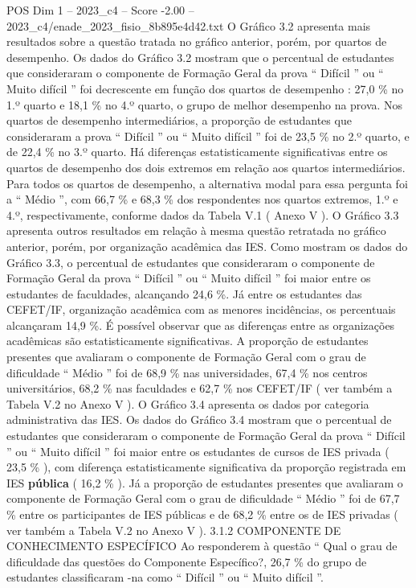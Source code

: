 \begin{textsample}{POS Dim 1 – 2023\_c4 – Score -2.00 – 2023\_c4/enade\_2023\_fisio\_8b895e4d42.txt}
O Gráfico 3.2 apresenta mais resultados sobre a questão tratada no gráfico anterior, porém, por quartos de desempenho.
Os dados do Gráfico 3.2 mostram que o percentual de estudantes que consideraram o componente de Formação Geral da prova “ Difícil ” ou “ Muito difícil ” foi decrescente em função dos quartos de desempenho : 27,0 \% no 1.º quarto e 18,1 \% no 4.º quarto, o grupo de melhor desempenho na prova.
Nos quartos de desempenho intermediários, a proporção de estudantes que consideraram a prova “ Difícil ” ou “ Muito difícil ” foi de 23,5 \% no 2.º quarto, e de 22,4 \% no 3.º quarto.
Há diferenças estatisticamente significativas entre os quartos de desempenho dos dois extremos em relação aos quartos intermediários.
Para todos os quartos de desempenho, a alternativa modal para essa pergunta foi a “ Médio ”, com 66,7 \% e 68,3 \% dos respondentes nos quartos extremos, 1.º e 4.º, respectivamente, conforme dados da Tabela V.1 ( Anexo V ).
O Gráfico 3.3 apresenta outros resultados em relação à mesma questão retratada no gráfico anterior, porém, por organização acadêmica das IES.
Como mostram os dados do Gráfico 3.3, o percentual de estudantes que consideraram o componente de Formação Geral da prova “ Difícil ” ou “ Muito difícil ” foi maior entre os estudantes de faculdades, alcançando 24,6 \%.
Já entre os estudantes das CEFET/IF, organização acadêmica com as menores incidências, os percentuais alcançaram 14,9 \%.
É possível observar que as diferenças entre as organizações acadêmicas são estatisticamente significativas.
A proporção de estudantes presentes que avaliaram o componente de Formação Geral com o grau de dificuldade “ Médio ” foi de 68,9 \% nas universidades, 67,4 \% nos centros universitários, 68,2 \% nas faculdades e 62,7 \% nos CEFET/IF ( ver também a Tabela V.2 no Anexo V ).
O Gráfico 3.4 apresenta os dados por categoria administrativa das IES.
Os dados do Gráfico 3.4 mostram que o percentual de estudantes que consideraram o componente de Formação Geral da prova “ Difícil ” ou “ Muito difícil ” foi maior entre os estudantes de cursos de IES privada ( 23,5 \% ), com diferença estatisticamente significativa da proporção registrada em IES \textbf{pública} ( 16,2 \% ).
Já a proporção de estudantes presentes que avaliaram o componente de Formação Geral com o grau de dificuldade “ Médio ” foi de 67,7 \% entre os participantes de IES públicas e de 68,2 \% entre os de IES privadas ( ver também a Tabela V.2 no Anexo V ). 3.1.2 COMPONENTE DE CONHECIMENTO ESPECÍFICO Ao responderem à questão “ Qual o grau de dificuldade das questões do Componente Específico?, 26,7 \% do grupo de estudantes classificaram -na como “ Difícil ” ou “ Muito difícil ”.

\end{textsample}

